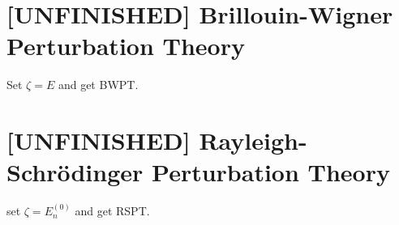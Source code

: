 \section{[UNFINISHED] Brillouin-Wigner Perturbation Theory}

Set $\zeta = E$ and get BWPT\cite{brillouin1932problemes,wigner1935modification}.

\section{[UNFINISHED] Rayleigh-Schrödinger Perturbation Theory}

set $\zeta = E_n^{(0)}$ and get RSPT\cite{rayleigh1894theory,schrodinger1926quantisierung}.
